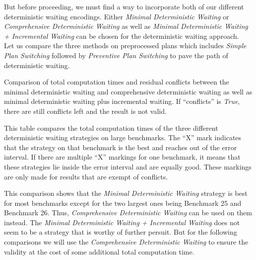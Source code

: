 \documentclass{llncs}
\begin{document}
But before proceeding, we must find a way to incorporate both of our different deterministic waiting encodings. Either \emph{Minimal Deterministic Waiting} or \emph{Comprehensive Deterministic Waiting} as well as \emph{Minimal Deterministic Waiting + Incremental Waiting} can be chosen for the deterministic waiting approach.\\
Let us compare the three methods on preprocessed plans which includes \emph{Simple Plan Switching} followed by \emph{Preventive Plan Switching} to pave the path of deterministic waiting.

\begin{table}[]
    \centering
    \vspace{1cm}
    \caption{Comparison of total computation times and residual conflicts between the minimal deterministic waiting and comprehensive deterministic waiting as well as minimal deterministic waiting plus incremental waiting. If ``conflicts'' is \emph{True}, there are still conflicts left and the result is not valid.}
    \label{tab:tab1}
\end{table}
\newpage
\begin{table}[]
    \centering
    \vspace{1cm}
    \caption{This table compares the total computation times of the three different deterministic waiting strategies on large benchmarks. The ``X'' mark indicates that the strategy on that benchmark is the best and reaches out of the error interval. If there are multiple ``X'' markings for one benchmark, it means that these strategies lie inside the error interval and are equally good. These markings are only made for results that are exempt of conflicts.}
    \label{tab:tab1}
\end{table}

This comparison shows that the \emph{Minimal Deterministic Waiting} strategy is best for most benchmarks except for the two largest ones being Benchmark 25 and Benchmark 26. Thus, \emph{Comprehensive Deterministic Waiting} can be used on them instead. The \emph{Minimal Deterministic Waiting + Incremental Waiting} does not seem to be a strategy that is worthy of further persuit.
But for the following comparisons we will use the \emph{Comprehensive Deterministic Waiting} to ensure the validity at the cost of some additional total computation time.
\end{document}
